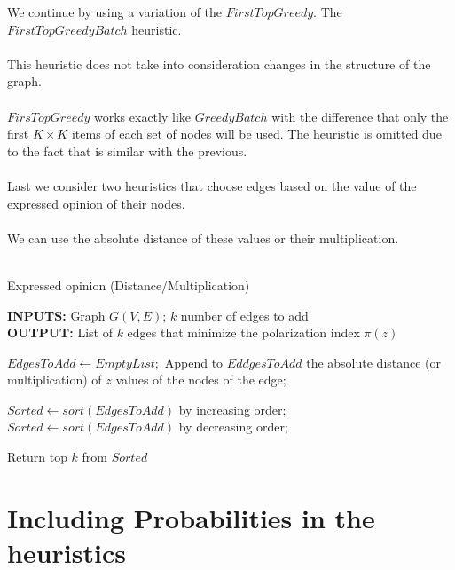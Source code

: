 \vspace{10pt}
\clearpage
\noindent We continue by using a variation of the $FirstTopGreedy$.  The $FirstTopGreedyBatch$ heuristic.
\\
\\
This heuristic does not take into consideration changes in the structure of the graph.
\\
\\
$FirsTopGreedy$  works exactly like $GreedyBatch$ with the difference that only the first $K \times K$ items of each set of nodes will be used. The heuristic is omitted due to the fact that is similar with the previous.
\\
\\
Last we consider two heuristics that choose edges based on the value of the expressed opinion of their nodes.
\\
\\
We can use the absolute distance of these values or their multiplication.
\\
\\
\begin{algorithm}[H]
	\caption{Expressed opinion (Distance/Multiplication)}
	\label{alg:expreDisMiss}
	
	\begin{flushleft}
        		\textbf{INPUTS:} Graph $G(V, E)$; $k$ number of edges to add\\
		\vspace{6pt}
        		\textbf{OUTPUT:} List of $k$ edges that minimize the polarization index $\pi(z)$
	\end{flushleft}
	
	\begin{algorithmic}[1]
		\STATE $EdgesToAdd \leftarrow Empty List;$
			\STATE Append to $EddgesToAdd$ the absolute distance (or multiplication) of $z$ values of the nodes of the edge;
		\ENDFOR
		
			\STATE $Sorted \leftarrow sort(EdgesToAdd)$ by increasing order;
		\ELSE 
			\STATE $Sorted \leftarrow sort(EdgesToAdd)$ by decreasing order;
		\ENDIF

		\STATE Return top $k$ from $Sorted$
	\end{algorithmic}
	
\end{algorithm}

\clearpage



\section{Including Probabilities in the heuristics}		
 \label{sec:linkpred}		


